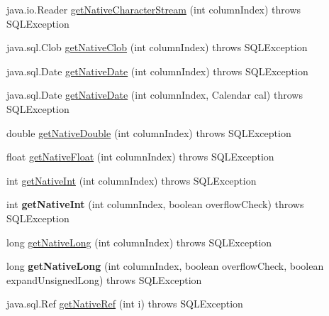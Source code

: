 \begin{DoxyCompactItemize}
\item 
java.\+io.\+Reader \mbox{\hyperlink{classcom_1_1mysql_1_1jdbc_1_1_result_set_impl_aa4b4211a652d497532ff8e857c0cb7a5}{get\+Native\+Character\+Stream}} (int column\+Index)  throws S\+Q\+L\+Exception 
\item 
java.\+sql.\+Clob \mbox{\hyperlink{classcom_1_1mysql_1_1jdbc_1_1_result_set_impl_af5981a9f77de2cfbdcf0fcb81de84116}{get\+Native\+Clob}} (int column\+Index)  throws S\+Q\+L\+Exception 
\item 
java.\+sql.\+Date \mbox{\hyperlink{classcom_1_1mysql_1_1jdbc_1_1_result_set_impl_a33bd8cbc2dd3679a2e995584de40d936}{get\+Native\+Date}} (int column\+Index)  throws S\+Q\+L\+Exception 
\item 
java.\+sql.\+Date \mbox{\hyperlink{classcom_1_1mysql_1_1jdbc_1_1_result_set_impl_a9f5825bb9f83d92ebebe4e1b1faec151}{get\+Native\+Date}} (int column\+Index, Calendar cal)  throws S\+Q\+L\+Exception 
\item 
double \mbox{\hyperlink{classcom_1_1mysql_1_1jdbc_1_1_result_set_impl_a99d94cf449e766d45479290479c57756}{get\+Native\+Double}} (int column\+Index)  throws S\+Q\+L\+Exception 
\item 
float \mbox{\hyperlink{classcom_1_1mysql_1_1jdbc_1_1_result_set_impl_ab7767239a1beed604ab40849316407c0}{get\+Native\+Float}} (int column\+Index)  throws S\+Q\+L\+Exception 
\item 
int \mbox{\hyperlink{classcom_1_1mysql_1_1jdbc_1_1_result_set_impl_a43ab3c7c0eef581dfd7643d15d8f3eb4}{get\+Native\+Int}} (int column\+Index)  throws S\+Q\+L\+Exception 
\item 
\mbox{\label{classcom_1_1mysql_1_1jdbc_1_1_result_set_impl_ac57c08eeca9aa7823aec37cfdf8930f3}} 
int {\bfseries get\+Native\+Int} (int column\+Index, boolean overflow\+Check)  throws S\+Q\+L\+Exception 
\item 
long \mbox{\hyperlink{classcom_1_1mysql_1_1jdbc_1_1_result_set_impl_a490267a20e1362fb98cde92a6424706a}{get\+Native\+Long}} (int column\+Index)  throws S\+Q\+L\+Exception 
\item 
\mbox{\label{classcom_1_1mysql_1_1jdbc_1_1_result_set_impl_a8c7d301b3d357952bc96716a40fe8ab1}} 
long {\bfseries get\+Native\+Long} (int column\+Index, boolean overflow\+Check, boolean expand\+Unsigned\+Long)  throws S\+Q\+L\+Exception 
\item 
java.\+sql.\+Ref \mbox{\hyperlink{classcom_1_1mysql_1_1jdbc_1_1_result_set_impl_ad943614b8eb9828bacf207844265f8b5}{get\+Native\+Ref}} (int i)  throws S\+Q\+L\+Exception 

\end{DoxyCompactItemize}
